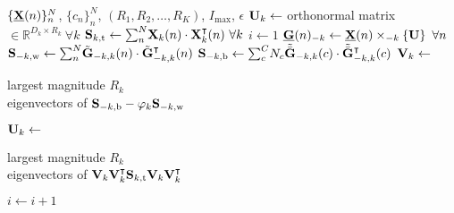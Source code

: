 \begin{algorithmic}[1]
	\Require $\{\ten{X}(n)\}_n^N$, $\{c_n\}_n^N$,
	$(R_1,R_2,\ldots,R_K)$, $I_\text{max}$, $\epsilon$
	\State $\mat{U}_k \gets $ orthonormal matrix $\in \mathbb{R}^{D_k\times R_k}
		\ \forall k$
	\State $\mat{S}_{k,\text{t}} \gets
		\textstyle{\sum_n^N}\mat{X}_k(n)\cdot\mat{X}_k^\intercal(n)\ \forall k$
	\State $i\gets 1$
	\Repeat
	\State $\ten{G}(n)_{-k} \gets \ten{X}(n)\mmprs{\mat{U}}{k} \ \forall n$
	\State $\mat{S}_{-k,\text{w}} \gets
		\textstyle{\sum_n^N}\tilde{\mat{G}}_{-k,k}(n)\cdot\tilde{\mat{G}}_{-k,k}^\intercal(n)$
	\State $\mat{S}_{-k,\text{b}} \gets
		\textstyle{\sum_c^C}N_c\tilde{\bar{\mat{G}}}_{-k,k}(c)\cdot\tilde{\bar{\mat{G}}}_{-k,k}^\intercal(c)$
	\State $\mat{V}_k\gets$ \parbox[t]{5cm}{largest magnitude $R_k$ \\ eigenvectors of
	$\mat{S}_{-k,\text{b}} - \varphi_k\mat{S}_{-k,\text{w}}$}
	\State $\mat{U}_k \gets$ \parbox[t]{5cm}{largest magnitude $R_k$ \\
	eigenvectors of $\mat{V}_k\mat{V}_k^\intercal\mat{S}_{k,\text{t}}\mat{V}_k\mat{V}_k^\intercal$}
	\EndFor
	\State $i\gets i+1$
\end{algorithmic}
